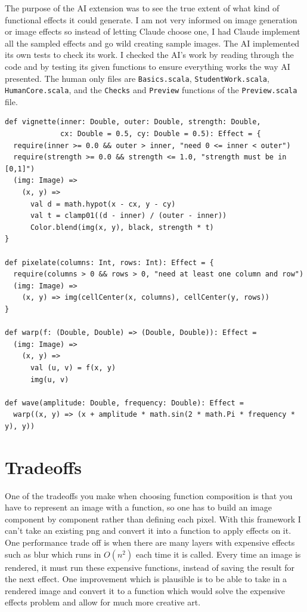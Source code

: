 \documentclass[11pt,letterpaper]{article}
\newcommand{\code}[1]{\texttt{#1}}
\begin{document}
The purpose of the AI extension was to see the true extent of what kind of functional effects it could generate. I am not very informed on image generation or image effects so instead of letting Claude choose one, I had Claude implement all the sampled effects and go wild creating sample images. The AI implemented its own tests to check its work. I checked the AI's work by reading through the code and by testing its given functions to ensure everything works the way AI presented. The human only files are \code{Basics.scala}, \code{StudentWork.scala}, \code{HumanCore.scala}, and the \code{Checks} and \code{Preview} functions of the \code{Preview.scala} file.

\begin{lstlisting}[caption={Representative AI-generated effects (\code{AiExtension.scala})}]
def vignette(inner: Double, outer: Double, strength: Double,
             cx: Double = 0.5, cy: Double = 0.5): Effect = {
  require(inner >= 0.0 && outer > inner, "need 0 <= inner < outer")
  require(strength >= 0.0 && strength <= 1.0, "strength must be in [0,1]")
  (img: Image) =>
    (x, y) =>
      val d = math.hypot(x - cx, y - cy)
      val t = clamp01((d - inner) / (outer - inner))
      Color.blend(img(x, y), black, strength * t)
}

def pixelate(columns: Int, rows: Int): Effect = {
  require(columns > 0 && rows > 0, "need at least one column and row")
  (img: Image) =>
    (x, y) => img(cellCenter(x, columns), cellCenter(y, rows))
}

def warp(f: (Double, Double) => (Double, Double)): Effect =
  (img: Image) =>
    (x, y) =>
      val (u, v) = f(x, y)
      img(u, v)

def wave(amplitude: Double, frequency: Double): Effect =
  warp((x, y) => (x + amplitude * math.sin(2 * math.Pi * frequency * y), y))
\end{lstlisting}

\section{Tradeoffs}

One of the tradeoffs you make when choosing function composition is that you have to represent an image with a function, so one has to build an image component by component rather than defining each pixel. With this framework I can't take an existing png and convert it into a function to apply effects on it. One performance trade off is when there are many layers with expensive effects such as blur which runs in $O(n^2)$ each time it is called. Every time an image is rendered, it must run these expensive functions, instead of saving the result for the next effect. One improvement which is plausible is to be able to take in a rendered image and convert it to a function which would solve the expensive effects problem and allow for much more creative art.
\end{document}
